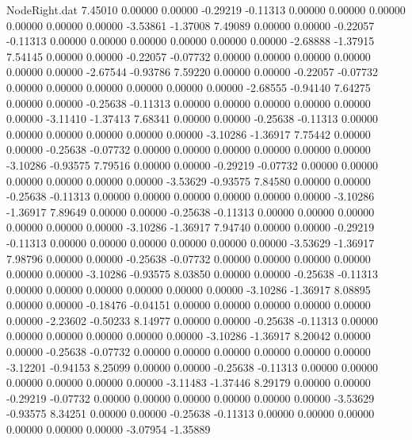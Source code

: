 \begin{filecontents}{NodeRight.dat}
   7.45010    0.00000    0.00000    -0.29219   -0.11313    0.00000    0.00000    0.00000    0.00000    0.00000    0.00000   -3.53861   -1.37008
   7.49089    0.00000    0.00000    -0.22057   -0.11313    0.00000    0.00000    0.00000    0.00000    0.00000    0.00000   -2.68888   -1.37915
   7.54145    0.00000    0.00000    -0.22057   -0.07732    0.00000    0.00000    0.00000    0.00000    0.00000    0.00000   -2.67544   -0.93786
   7.59220    0.00000    0.00000    -0.22057   -0.07732    0.00000    0.00000    0.00000    0.00000    0.00000    0.00000   -2.68555   -0.94140
   7.64275    0.00000    0.00000    -0.25638   -0.11313    0.00000    0.00000    0.00000    0.00000    0.00000    0.00000   -3.11410   -1.37413
   7.68341    0.00000    0.00000    -0.25638   -0.11313    0.00000    0.00000    0.00000    0.00000    0.00000    0.00000   -3.10286   -1.36917
   7.75442    0.00000    0.00000    -0.25638   -0.07732    0.00000    0.00000    0.00000    0.00000    0.00000    0.00000   -3.10286   -0.93575
   7.79516    0.00000    0.00000    -0.29219   -0.07732    0.00000    0.00000    0.00000    0.00000    0.00000    0.00000   -3.53629   -0.93575
   7.84580    0.00000    0.00000    -0.25638   -0.11313    0.00000    0.00000    0.00000    0.00000    0.00000    0.00000   -3.10286   -1.36917
   7.89649    0.00000    0.00000    -0.25638   -0.11313    0.00000    0.00000    0.00000    0.00000    0.00000    0.00000   -3.10286   -1.36917
   7.94740    0.00000    0.00000    -0.29219   -0.11313    0.00000    0.00000    0.00000    0.00000    0.00000    0.00000   -3.53629   -1.36917
   7.98796    0.00000    0.00000    -0.25638   -0.07732    0.00000    0.00000    0.00000    0.00000    0.00000    0.00000   -3.10286   -0.93575
   8.03850    0.00000    0.00000    -0.25638   -0.11313    0.00000    0.00000    0.00000    0.00000    0.00000    0.00000   -3.10286   -1.36917
   8.08895    0.00000    0.00000    -0.18476   -0.04151    0.00000    0.00000    0.00000    0.00000    0.00000    0.00000   -2.23602   -0.50233
   8.14977    0.00000    0.00000    -0.25638   -0.11313    0.00000    0.00000    0.00000    0.00000    0.00000    0.00000   -3.10286   -1.36917
   8.20042    0.00000    0.00000    -0.25638   -0.07732    0.00000    0.00000    0.00000    0.00000    0.00000    0.00000   -3.12201   -0.94153
   8.25099    0.00000    0.00000    -0.25638   -0.11313    0.00000    0.00000    0.00000    0.00000    0.00000    0.00000   -3.11483   -1.37446
   8.29179    0.00000    0.00000    -0.29219   -0.07732    0.00000    0.00000    0.00000    0.00000    0.00000    0.00000   -3.53629   -0.93575
   8.34251    0.00000    0.00000    -0.25638   -0.11313    0.00000    0.00000    0.00000    0.00000    0.00000    0.00000   -3.07954   -1.35889

\end{filecontents}
